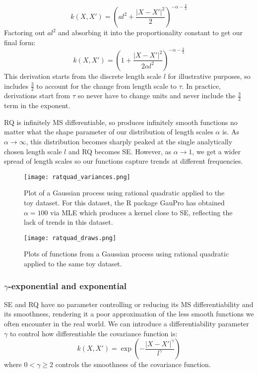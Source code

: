 \begin{equation*}
    k(X,X') = \left( al^2 + \frac{|X - X'|^2}{2} \right)^{-\alpha - \frac{3}{2}}
\end{equation*}
Factoring out $al^2$ and absorbing it into the proportionality constant to get our final form:
\begin{equation*}
    k(X,X') = \left( 1 + \frac{|X - X'|^2}{2\alpha l^2} \right)^{-\alpha - \frac{3}{2}}
\end{equation*}
This derivation starts from the discrete length scale $l$ for illustrative purposes, so includes $\frac{3}{2}$ to account for the change from length scale to $\tau$. In practice, derivations start from $\tau$ so never have to change units and never include the $\frac{3}{2}$ term in the exponent.

RQ is infinitely MS differentiable, so produces infinitely smooth functions no matter what the shape parameter of our distribution of length scales $\alpha$ is. As $\alpha \to \infty$, this distribution becomes sharply peaked at the single analytically chosen length scale $l$ and RQ becomes SE. However, as $\alpha \to 1$, we get a wider spread of length scales so our functions capture trends at different frequencies. 

\begin{figure}[H]
    \texttt{[image: ratquad\_variances.png]}
    \caption{
        Plot of a Gaussian process using rational quadratic applied to the toy dataset. For this dataset, the R package GauPro \cite{gaupro} has obtained $\alpha = 100$ via MLE which produces a kernel close to SE, reflecting the lack of trends in this dataset. \\
    }
\end{figure}

\begin{figure}[H]
    \texttt{[image: ratquad\_draws.png]} \\
    \caption{
        Plots of functions from a Gaussian process using rational quadratic applied to the same toy dataset. \\
    }
\end{figure}

\subsubsection{$\gamma$-exponential and exponential}
SE and RQ have no parameter controlling or reducing its MS differentiability and its smoothness, rendering it a poor approximation of the less smooth functions we often encounter in the real world. We can introduce a differentiability parameter $\gamma$ to control how differentiable the covariance function is:
\begin{equation*}
    k(X,X') = \exp \left(-\frac{|X - X'|^{\gamma}}{l^{\gamma}} \right)
\end{equation*}
where $0 < \gamma \geq 2$ controls the smoothness of the covariance function. 

